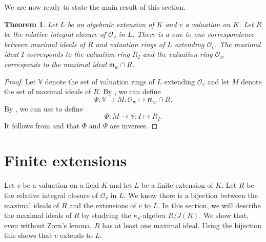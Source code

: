 \documentclass[12pt,a4paper]{amsart}
\newtheorem{thm}{Theorem}[section]
\theoremstyle{definition}
\begin{document}
We are now ready to state the main result of this section.
\begin{thm}{\label{bijection}}
Let $L$ be an algebraic extension of $K$ and $v$ a valuation on $K$.
Let $R$ be the relative integral closure of $\mathcal{O}_v$ in $L$.
There is a one to one correspondence between maximal ideals of $R$ and valuation rings of $L$ extending $\mathcal{O}_v$.
The maximal ideal $I$ corresponds to the valuation ring $R_I$ and the valuation ring $\mathcal{O}_w$ corresponds to the maximal ideal $\mathfrak{m}_w\cap R$.
\end{thm}
\begin{proof}
Let $\mathds{V}$ denote the set of valuation rings of $L$ extending $\mathcal{O}_v$
and let $M$ denote the set of maximal ideals of $R$.
By , we can define $$\Psi:\mathds{V}\rightarrow M:\mathcal{O}_w\mapsto \mathfrak{m}_w\cap R.$$
By , we can use  to define $$\Phi:M\rightarrow \mathds{V}:I\mapsto R_I.$$
It follows from  and  that $\Phi$ and $\Psi$ are inverses.
\end{proof}

\section{Finite extensions}
Let $v$ be a valuation on a field $K$ and let $L$ be a finite extension of $K$.
Let $R$ be the relative integral closure of $\mathcal{O}_v$ in $L$.
We know there is a bijection between the maximal ideals of $R$ and the extensions of $v$ to $L$.
In this section, we will describe the maximal ideals of $R$ by studying the $\kappa_v$-algebra $R/J(R)$.
We show that, even without Zorn's lemma, $R$ has at least one maximal ideal.
Using the bijection this shows that $v$ extends to $L$.
\end{document}
